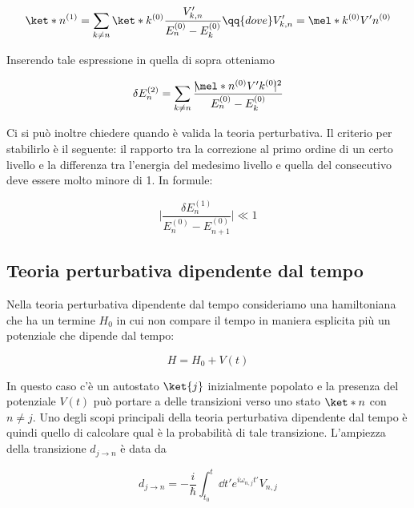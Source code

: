 \begin{equation*}
   \ket*{n^{(1)}}
   =\sum_{k \neq n} \ket*{k^{(0)}} \frac{V'_{k,n}}{E_n^{(0)} - E_k^{(0)}}
   \qq{dove}
   V'_{k,n}=\mel*{k^{(0)}}{V'}{n^{(0)}}
\end{equation*}

Inserendo tale espressione in quella di sopra otteniamo

\begin{equation*}
   \delta E_n^{(2)}
   =\sum_{k \neq n} \frac{| \hspace{-0.1cm} \mel*{n^{(0)}}{V'}{k^{(0)}} \hspace{-0.1cm} |^2}{E_n^{(0)} - E_k^{(0)}}
\end{equation*}

Ci si può inoltre chiedere quando è valida la teoria perturbativa. Il criterio per stabilirlo è il seguente: il rapporto tra la correzione al primo ordine di un certo livello e la differenza tra l'energia del medesimo livello e quella del consecutivo deve essere molto minore di 1. In formule:

\begin{equation*}
   \biggl| \frac{\delta E_n^{(1)}}{ E_n^{(0)} - E_{n+1}^{(0)} } \biggr| \ll 1
\end{equation*}

\subsection*{Teoria perturbativa dipendente dal tempo}

Nella teoria perturbativa dipendente dal tempo consideriamo una hamiltoniana che ha un termine $H_0$ in cui non compare il tempo in maniera esplicita più un potenziale che dipende dal tempo:

\begin{equation*}
   H=H_0 + V(t)
\end{equation*}

In questo caso c'è un autostato $\ket{j}$ inizialmente popolato e la presenza del potenziale $V(t)$ può portare a delle transizioni verso uno stato $\ket*{n}$ con $n \neq j$. Uno degli scopi principali della teoria perturbativa dipendente dal tempo è quindi quello di calcolare qual è la probabilità di tale transizione. L'ampiezza della transizione $d_{j \to n}$ è data da

\begin{equation*}
   d_{j \to n}=-\frac{i}{\hbar} \int_{t_0}^{t} \dd{t'} e^{i \omega_{n,j} t'} V_{n,j}
\end{equation*}

